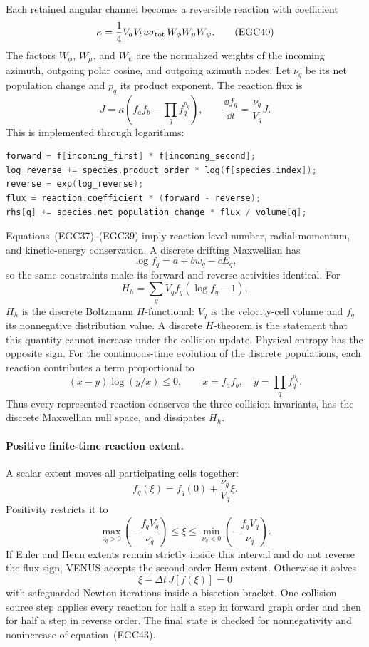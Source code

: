Each retained angular channel becomes a reversible reaction with coefficient
\[
 \kappa=
 \frac14V_aV_bu\sigma_{\rm tot}\,
 W_{\phi}W_\mu W_\psi.                                  \tag{EGC40}
\]
The factors \(W_\phi\), \(W_\mu\), and \(W_\psi\) are the normalized weights
of the incoming azimuth, outgoing polar cosine, and outgoing azimuth nodes.
Let \(\nu_q\) be its net population change and \(p_q\) its product exponent.
The reaction flux is
\[
 J=\kappa\left(f_af_b-\prod_q f_q^{p_q}\right),\qquad
 \frac{\dd f_q}{\dd t}=\frac{\nu_q}{V_q}J.               \tag{EGC41}
\]
This is implemented through logarithms:
\begin{lstlisting}[language=C++]
forward = f[incoming_first] * f[incoming_second];
log_reverse += species.product_order * log(f[species.index]);
reverse = exp(log_reverse);
flux = reaction.coefficient * (forward - reverse);
rhs[q] += species.net_population_change * flux / volume[q];
\end{lstlisting}

Equations~(EGC37)--(EGC39) imply reaction-level number, radial-momentum, and
kinetic-energy conservation.  A discrete drifting Maxwellian has
\[
 \log f_q=a+bw_q-cE_q,                                   \tag{EGC42}
\]
so the same constraints make its forward and reverse activities identical.
For
\[
 H_h=\sum_qV_qf_q(\log f_q-1),                           \tag{EGC43}
\]
\(H_h\) is the discrete Boltzmann \(H\)-functional: \(V_q\) is the
velocity-cell volume and \(f_q\) its nonnegative distribution value.  A
discrete \(H\)-theorem is the statement that this quantity cannot increase
under the collision update.  Physical entropy has the opposite sign.
For the continuous-time evolution of the discrete populations, each reaction
contributes a term proportional to
\[
 (x-y)\log(y/x)\le0,\qquad
 x=f_af_b,\quad y=\prod_qf_q^{p_q}.                      \tag{EGC44}
\]
Thus every represented reaction conserves the three collision invariants,
has the discrete Maxwellian null space, and dissipates \(H_h\).

\paragraph{Positive finite-time reaction extent.}
A scalar extent moves all participating cells together:
\[
 f_q(\xi)=f_q(0)+\frac{\nu_q}{V_q}\xi.                   \tag{EGC45}
\]
Positivity restricts it to
\[
 \max_{\nu_q>0}\left(-\frac{f_qV_q}{\nu_q}\right)
 \le\xi\le
 \min_{\nu_q<0}\left(-\frac{f_qV_q}{\nu_q}\right).       \tag{EGC46}
\]
If Euler and Heun extents remain strictly inside this interval and do not
reverse the flux sign, VENUS accepts the second-order Heun extent.  Otherwise
it solves
\[
 \xi-\Delta t\,J[f(\xi)]=0                              \tag{EGC47}
\]
with safeguarded Newton iterations inside a bisection bracket.  One collision
source step applies every reaction for half a step in forward graph order and
then for half a step in reverse order.  The final state is checked for
nonnegativity and nonincrease of equation~(EGC43).


